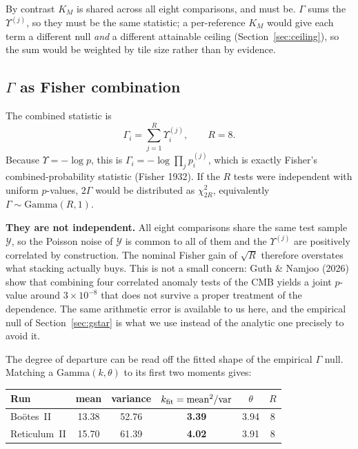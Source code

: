 \documentclass[11pt,a4paper]{article}
\newcommand{\Ycal}{\mathcal{Y}}              %
\newcommand{\Ups}{\Upsilon}                  %
\newcommand{\Gam}{\Gamma}                    %
\newcommand{\Ups}{\Upsilon}
\newcommand{\Gam}{\Gamma}
\newcommand{\Ycal}{\mathcal{Y}}
\begin{document}
By contrast $K_M$ is shared across all eight comparisons, and must be. $\Gam$ sums the
$\Ups^{(j)}$, so they must be the same statistic; a per-reference $K_M$ would give each term a
different null \emph{and} a different attainable ceiling (Section~\ref{sec:ceiling}), so the sum
would be weighted by tile size rather than by evidence.

\subsection{$\Gam$ as Fisher combination}
\label{sec:fisher}

The combined statistic is
%
\begin{equation}
\Gam_i = \sum_{j=1}^{R} \Ups_i^{(j)}, \qquad R = 8.
\label{eq:gamma}
\end{equation}
%
Because $\Ups = -\log p$, this is $\Gam_i = -\log \prod_j p_i^{(j)}$, which is exactly Fisher's
combined-probability statistic (Fisher 1932). If the $R$ tests were independent with uniform
$p$-values, $2\Gam$ would be distributed as $\chi^2_{2R}$, equivalently
$\Gam \sim \mathrm{Gamma}(R,1)$.

\textbf{They are not independent.} All eight comparisons share the same test sample $\Ycal$, so the
Poisson noise of $\Ycal$ is common to all of them and the $\Ups^{(j)}$ are positively correlated by
construction. The nominal Fisher gain of $\sqrt{R}$ therefore overstates what stacking actually
buys. This is not a small concern: Guth \& Namjoo (2026) show that combining four correlated
anomaly tests of the CMB yields a joint $p$-value around $3\times10^{-8}$ that does not survive a
proper treatment of the dependence. The same arithmetic error is available to us here, and the
empirical null of Section~\ref{sec:gstar} is what we use instead of the analytic one precisely to
avoid it.

The degree of departure can be read off the fitted shape of the empirical $\Gam$ null. Matching a
$\mathrm{Gamma}(k,\theta)$ to its first two moments gives:

\begin{table}[h]
\centering\small
\begin{tabular}{@{}lccccc@{}}
\toprule
Run & mean & variance & $k_{\rm fit} = \mathrm{mean}^2/\mathrm{var}$ & $\theta$ & $R$\\
\midrule
Bo\"otes~II  & 13.38 & 52.76 & \textbf{3.39} & 3.94 & 8\\
Reticulum~II & 15.70 & 61.39 & \textbf{4.02} & 3.91 & 8\\
\bottomrule
\end{tabular}
\end{table}
\end{document}
